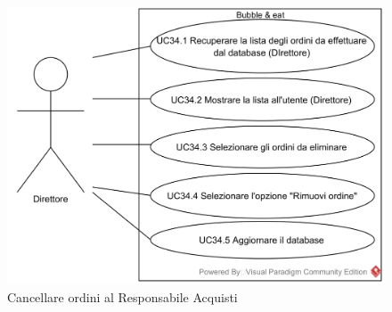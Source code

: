
\begin{figure}[H]
	\centering
	\includegraphics[width=15cm]{../../documenti/AnalisiDeiRequisiti/Diagrammi_img/usecase/uc3_15.png}
	\caption{\UCCaption{} Cancellare ordini al Responsabile Acquisti}
\end{figure}


